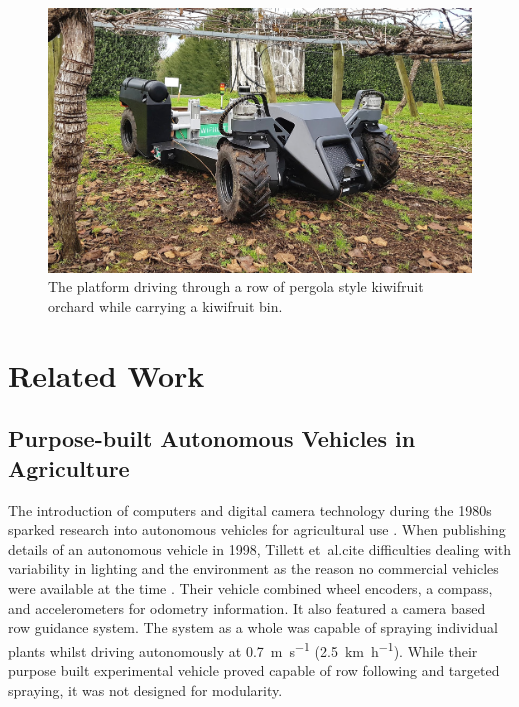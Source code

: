 \documentclass[preprint,authoryear,12pt]{elsarticle}
\begin{document}
    \begin{figure}[htb]
        \centering
        \includegraphics[width=\linewidth]{imgs/photos/suzy_general.jpg}
        \caption{
            The platform driving through a row of pergola style kiwifruit orchard while carrying a kiwifruit bin.
        }
        \label{fig:suzy}
    \end{figure}


\section{Related Work}
\label{sect:review}

    \subsection{Purpose-built Autonomous Vehicles in Agriculture}

        The introduction of computers and digital camera technology during the 1980s sparked research into autonomous vehicles for agricultural use \citep{Li2009}.
        When publishing details of an autonomous vehicle in 1998, Tillett et~al.\@ cite difficulties dealing with variability in lighting and the environment as the reason no commercial vehicles were available at the time \citep{Tillett1998}.
        Their vehicle combined wheel encoders, a compass, and accelerometers for odometry information.
        It also featured a camera based row guidance system.
        The system as a whole was capable of spraying individual plants whilst driving autonomously at \SI{0.7}{\meter\per\second} (\SI{2.5}{\kilo\meter\per\hour}).
        While their purpose built experimental vehicle proved capable of row following and targeted spraying, it was not designed for modularity.
\end{document}
